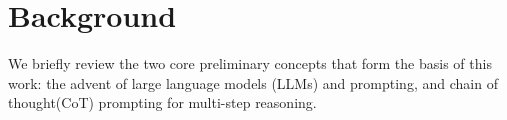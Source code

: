 \documentclass{article}
\newcommand{\kojima}[1]{{\color{red}[{#1} --TK]}}
\newcommand{\sg}[1]{{\color{orange}[{#1} --SG]}}
\newcommand{\CoT}{chain of thought\xspace}
\begin{document}




\section{Background}   
We briefly review the two core preliminary concepts that form the basis of this work: the advent of large language models (LLMs) and prompting, and \CoT (CoT) prompting for multi-step reasoning.
\end{document}
